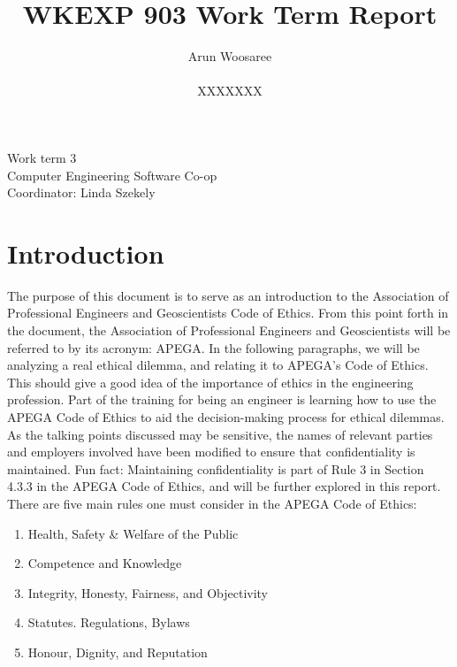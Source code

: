 \documentclass[letterpaper,12pt]{article}
\title{WKEXP 903 Work Term Report}
\author{Arun Woosaree \\ \\ XXXXXXX}
\begin{document}
\relax
\begin{titlepage}
 \maketitle
 \thispagestyle{empty} %
 \centering
 \large
 \vspace{1cm}
 Work term 3\\
 \vspace{1cm}
 Computer Engineering Software Co-op \\
 \vspace{1cm}
 Coordinator: Linda Szekely
\end{titlepage}

\section{Introduction}
The purpose of this document is to serve as an introduction to the Association of Professional Engineers and Geoscientists Code of Ethics\cite{apegacode}.
From this point forth in the document, the Association of Professional Engineers and Geoscientists will be referred to by its acronym: APEGA.
In the following paragraphs, we will be analyzing a real ethical dilemma, and relating it to APEGA's Code of Ethics. This should give a good idea
of the importance of ethics in the engineering profession. Part of the training for being an engineer is learning how to use the APEGA Code of Ethics
to aid the decision-making process for ethical dilemmas. As the talking points discussed may be sensitive, the names of relevant parties and employers involved have been modified to ensure that confidentiality is maintained.
Fun fact: Maintaining confidentiality is part of Rule 3 in Section 4.3.3 in the APEGA Code of Ethics, and will be further explored in this report.
There are five main rules one must consider in the APEGA Code of Ethics:
\begin{enumerate}
    \setlength{\itemsep}{0pt}
    \setlength{\parskip}{0pt}
    \setlength{\parsep}{0pt} 
    \item Health, Safety \& Welfare of the Public
    \item Competence and Knowledge
    \item Integrity, Honesty, Fairness, and Objectivity
    \item Statutes. Regulations, Bylaws
    \item Honour, Dignity, and Reputation
\end{enumerate}
\end{document}
